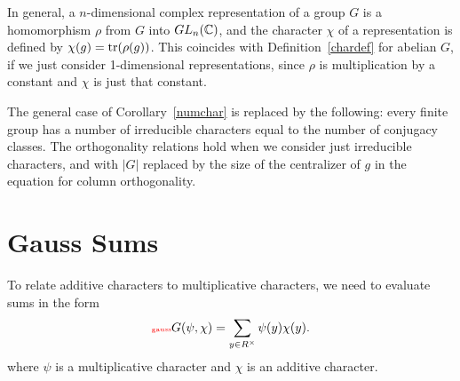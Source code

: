 \begin{rem}
In general, a $n$-dimensional complex {representation} of a group $G$ is a homomorphism $\rho$ from $G$ into $GL_n(\mathbb{C})$, and the character $\chi$ of a representation is defined by $\chi(g)=\operatorname{tr}(\rho(g))$.  %
This coincides with Definition~\ref{chardef} for abelian $G$, if we just consider 1-dimensional representations, since $\rho$ is multiplication by a constant and $\chi$ is just that constant.

The general case of Corollary~\ref{numchar} is replaced by the following:  every finite group has a number of irreducible characters equal to the number of conjugacy classes. The orthogonality relations hold when we consider just irreducible characters, and with $|G|$ replaced by the size of the centralizer of $g$ in the equation for column orthogonality.
\end{rem}
\section{Gauss Sums}
To relate additive characters to multiplicative characters, we need to evaluate sums in the form
\begin{equation}\llabel{gauss}
G(\psi,\chi)=\sum_{y\in R^{\times}}\psi(y)\chi(y).
\end{equation}
where $\psi$ is a multiplicative character and $\chi$ is an additive character.

